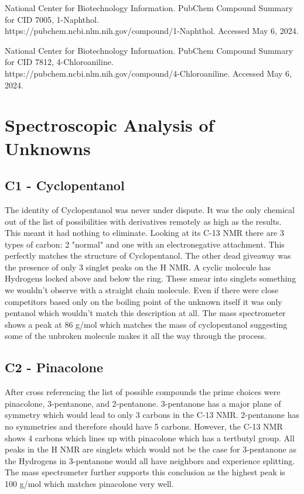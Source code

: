\documentclass{article}
\begin{document}
	National Center for Biotechnology Information. PubChem Compound Summary for CID 7005, 1-Naphthol.\\ https://pubchem.ncbi.nlm.nih.gov/compound/1-Naphthol. Accessed May 6, 2024.
	
	National Center for Biotechnology Information. PubChem Compound Summary for CID 7812, 4-Chloroaniline.\\ https://pubchem.ncbi.nlm.nih.gov/compound/4-Chloroaniline. Accessed May 6, 2024.
	\pagebreak
	\section{Spectroscopic Analysis of Unknowns}
	
	\subsection{C1 - Cyclopentanol}
	The identity of Cyclopentanol was never under dispute. It was the only chemical out of the list of possibilities with derivatives remotely as high as the results. This meant it had nothing to eliminate. Looking at its C-13 NMR there are 3 types of carbon: 2 "normal" and one with an electronegative attachment. This perfectly matches the structure of Cyclopentanol. The other dead giveaway was the presence of only 3 singlet peaks on the H NMR. A cyclic molecule has Hydrogens locked above and below the ring. These smear into singlets something we wouldn't observe with a straight chain molecule. Even if there were close competitors based only on the boiling point of the unknown itself it was only pentanol which wouldn't match this description at all. The mass spectrometer shows a peak at 86 g/mol which matches the mass of cyclopentanol suggesting some of the unbroken molecule makes it all the way through the process.
	
	\subsection{C2 - Pinacolone}
	After cross referencing the list of possible compounds the prime choices were pinacolone, 3-pentanone, and 2-pentanone. 3-pentanone has a major plane of symmetry which would lead to only 3 carbons in the C-13 NMR. 2-pentanone has no symmetries and therefore should have 5 carbons. However, the C-13 NMR shows 4 carbons which lines up with pinacolone which has a tertbutyl group. All peaks in the H NMR are singlets which would not be the case for 3-pentanone as the Hydrogens in 3-pentanone would all have neighbors and experience splitting. The mass spectrometer further supports this conclusion as the highest peak is 100 g/mol which matches pinacolone very well.
	
\end{document}

